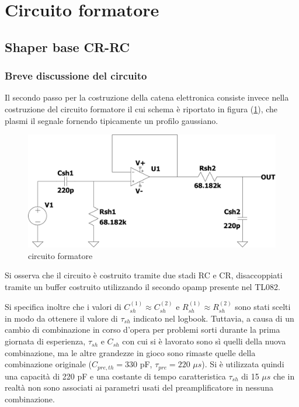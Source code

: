 \documentclass{article}
\begin{document}
\section{Circuito formatore}
\subsection{Shaper base CR-RC}
\subsubsection{Breve discussione del circuito}

Il secondo passo per la costruzione della catena elettronica consiste invece nella costruzione del circuito formatore il cui schema è 
riportato in figura (\ref{fig:shaper}), che plasmi il segnale fornendo tipicamente un profilo gaussiano.

\begin{center}
    \begin{figure}[H]
    \centering
    \includegraphics[scale=0.3, angle=0]{shaper.pdf}
    \caption{circuito formatore}
    \label{fig:shaper}
    \end{figure}
\end{center}
    
Si osserva che il circuito è costruito tramite due stadi RC e CR, disaccoppiati tramite un buffer costruito utilizzando il secondo 
opamp presente nel TL082.

Si specifica inoltre che i valori di $C_{sh}^{(1)}\approx C_{sh}^{(2)}$ e $R_{sh}^{(1)}\approx R_{sh}^{(2)}$ sono stati scelti in modo da ottenere 
il valore di $\tau_{sh}$ indicato nel logbook. Tuttavia, a causa di un cambio di combinazione in corso d'opera per problemi sorti durante la 
prima giornata di esperienza, $\tau_{sh}$ e $C_{sh}$ con cui si è lavorato sono sì quelli della nuova combinazione, ma le altre grandezze in gioco sono rimaste quelle
della combinazione originale ($C_{pre,th}=330$ pF, $\tau_{pre}=220$ $\mu s$). Si è utilizzata quindi una capacità di 220 pF
e una costante di tempo caratteristica $\tau_{sh}$ di 15 $\mu s$ che in realtà non sono associati ai parametri usati del preamplificatore in nessuna combinazione.
\end{document}
